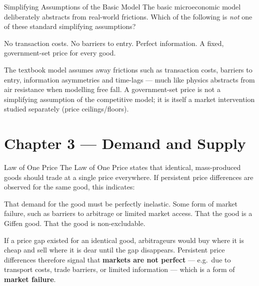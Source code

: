 \begin{question}[type=mc]{Simplifying Assumptions of the Basic Model}
The basic microeconomic model deliberately abstracts from real-world
frictions. Which of the following is \emph{not} one of these standard
simplifying assumptions?
\begin{choices}
  \choice        No transaction costs.
  \choice        No barriers to entry.
  \choice        Perfect information.
  \correctchoice A fixed, government-set price for every good.
\end{choices}
\begin{solution}
  The textbook model assumes away frictions such as transaction costs,
  barriers to entry, information asymmetries and time-lags — much like
  physics abstracts from air resistance when modelling free fall. A
  government-set price is not a simplifying assumption of the competitive
  model; it is itself a market intervention studied separately (price
  ceilings/floors).
\end{solution}
\end{question}


\section{Chapter 3 — Demand and Supply}

\begin{question}[type=mc]{Law of One Price}
The Law of One Price states that identical, mass-produced goods should trade
at a single price everywhere. If persistent price differences are observed
for the same good, this indicates:
\begin{choices}
  \choice        That demand for the good must be perfectly inelastic.
  \correctchoice Some form of market failure, such as barriers to arbitrage
                 or limited market access.
  \choice        That the good is a Giffen good.
  \choice        That the good is non-excludable.
\end{choices}
\begin{solution}
  If a price gap existed for an identical good, arbitrageurs would buy where
  it is cheap and sell where it is dear until the gap disappears. Persistent
  price differences therefore signal that \textbf{markets are not perfect} —
  e.g.\ due to transport costs, trade barriers, or limited information —
  which is a form of \textbf{market failure}.
\end{solution}
\end{question}

